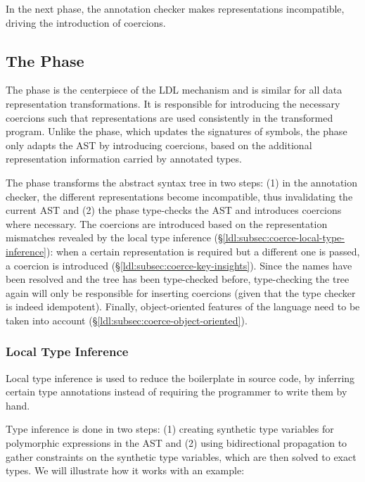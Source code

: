In the next phase, the annotation checker makes representations incompatible, driving the introduction of coercions.

\subsection{The \Coerce{} Phase}
\label{ldl:sec:transform:coerce}

The \coerce{} phase is the centerpiece of the LDL mechanism and is similar for all data representation transformations. It is responsible for introducing the necessary coercions such that representations are used consistently in the transformed program. Unlike the \inject{} phase, which updates the signatures of symbols, the \coerce{} phase only adapts the AST by introducing coercions, based on the additional representation information carried by annotated types.

The \coerce{} phase transforms the abstract syntax tree in two steps: (1) in the annotation checker, the different representations become incompatible, thus invalidating the current AST and (2) the \coerce{} phase type-checks the AST and introduces coercions where necessary. The coercions are introduced based on the representation mismatches revealed by the local type inference (\S\ref{ldl:subsec:coerce-local-type-inference}): when a certain representation is required but a different one is passed, a coercion is introduced (\S\ref{ldl:subsec:coerce-key-insights}). Since the names have been resolved and the tree has been type-checked before, type-checking the tree again will only be responsible for inserting coercions (given that the type checker is indeed idempotent). Finally, object-oriented features of the language need to be taken into account (\S\ref{ldl:subsec:coerce-object-oriented}).

\subsubsection*{Local Type Inference}
\label{ldl:subsec:coerce-local-type-inference}

Local type inference \cite{odersky-colored-local-type-inf, pierce-local-type-inference} is used to reduce the boilerplate in source code, by inferring certain type annotations instead of requiring the programmer to write them by hand.

Type inference is done in two steps: (1) creating synthetic type variables for polymorphic expressions in the AST and (2) using bidirectional propagation to gather constraints on the synthetic type variables, which are then solved to exact types. We will illustrate how it works with an example:

